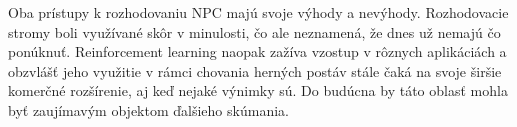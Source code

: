 \documentclass[slovak, master]{diploma}
\begin{document}
Oba prístupy k rozhodovaniu NPC majú svoje výhody a nevýhody. Rozhodovacie stromy boli využívané skôr v minulosti, čo ale neznamená, že dnes už nemajú čo ponúknuť. Reinforcement learning naopak zažíva vzostup v rôznych aplikáciách a obzvlášť jeho využitie v rámci chovania herných postáv stále čaká na svoje širšie komerčné rozšírenie, aj keď nejaké výnimky sú. Do budúcna by táto oblasť mohla byť zaujímavým objektom ďalšieho skúmania.

\printbibliography[title={Literatúra}, heading=bibintoc]

\appendix

\end{document}
